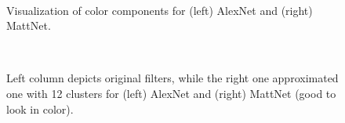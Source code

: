 \begin{figure}[t]
\mbox{
  \quad
{}
}
\label{components}
\caption{Visualization of color components for (left) AlexNet and (right) MattNet.}
\end{figure}


\begin{figure}[t]
\mbox{
  \quad
{}
}
\label{denoising}
\caption{Left column depicts original filters, while the right one approximated one with 12 clusters for (left) AlexNet and (right) MattNet (good to look in color). }
\end{figure}


